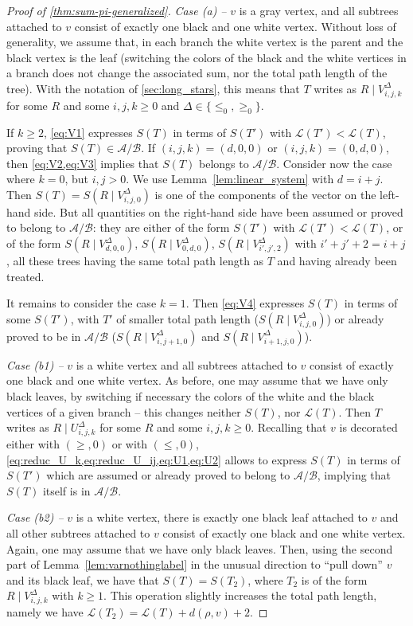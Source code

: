 \documentclass[12pt]{amsart}
\theoremstyle{plain}
\theoremstyle{remark}
\def\cL{\mathcal{L}}
\def\cA{\mathcal{A}}
\def\cB{\mathcal{B}}
\begin{document}
\begin{proof}[Proof of \cref{thm:sum-pi-generalized}]
{\em Case (a) --} $v$ is a gray vertex, 
and all subtrees attached to $v$ consist of exactly one black and one white vertex.
Without loss of generality, we assume that, in each branch the white vertex is the parent and
the black vertex is the leaf (switching the colors of the black and the white vertices in a branch does not change the associated sum, nor the total path length of the tree).
With the notation of \cref{sec:long_stars}, this means that $T$ writes as $R \mid V^{\Delta}_{i,j,k}$
for some $R$ and some $i,j,k \ge 0$ and $\Delta \in \{\le_0,\ge_0\}$.

If $k \ge 2$, \cref{eq:V1} expresses $S(T)$ in terms of $S(T')$ with $\cL(T') <  \cL(T)$,
proving that $S(T) \in \cA/\cB$. 
If $(i,j,k) = (d,0,0)$ or $(i,j,k) = (0,d,0)$, then \cref{eq:V2,eq:V3}
implies that $S(T)$ belongs to $\cA/\cB$.
Consider now the case where $k=0$, but $i,j>0$.
We use Lemma~\ref{lem:linear_system} with $d=i+j$.
 Then $S(T)=S(R \mid V^{\Delta}_{i,j,0})$ is one of the components
 of the vector on the left-hand side. But all quantities on the right-hand side
 have been assumed or proved to belong to $\cA/\cB$:
 they are either of the form $S(T')$ with $\cL(T') <  \cL(T)$, or 
 of the form $S(R \mid V^{\Delta}_{d,0,0})$, $S(R \mid V^{\Delta}_{0,d,0})$, $S(R \mid V^{\Delta}_{i',j',2})$ with $i'+j'+2=i+j$, all these trees having the same total path length as $T$
 and having already been treated.
 
 It remains to consider the case $k=1$. Then \eqref{eq:V4}
 expresses $S(T)$ in terms of some $S(T')$, with $T'$ of smaller total path length ($S(R \mid V^{\Delta}_{i,j,0})$) or already proved to be in  $\cA/\cB$
 ($S(R \mid V^{\Delta}_{i,j+1,0})$ and $S(R \mid V^{\Delta}_{i+1,j,0})$).
 \smallskip
 
 {\em Case (b1) --}
$v$ is a white vertex and all subtrees attached to $v$ 
consist of exactly one black and one white vertex.
As before, one may assume that we have only black leaves, by switching if necessary
the colors of the white and the black vertices of a given branch -- this changes neither $S(T)$, nor $\cL(T)$.
Then $T$ writes as $R \mid U^{\Delta}_{i,j,k}$
for some $R$ and some $i,j,k \ge 0$.
 Recalling that $v$ is decorated either with $(\ge,0)$ or with $(\le,0)$, \cref{eq:reduc_U_k,eq:reduc_U_ij,eq:U1,eq:U2} 
allows to express $S(T)$ in terms of $S(T')$ which are assumed or already proved to belong to  $\cA/\cB$, implying that $S(T)$ itself is in $\cA/\cB$.
\smallskip

 {\em Case (b2) --} $v$ is a white vertex, there is exactly one black leaf attached to $v$ and all other subtrees attached to $v$ 
consist of exactly one black and one white vertex.
 Again, one may assume that we have only black leaves.
 Then, using the second part of Lemma~\ref{lem:varnothinglabel} in the unusual direction
  to \enquote{pull down} $v$ and its black leaf, 
 we have that $S(T)=S(T_2)$, where $T_2$ is of the form $R \mid V^{\Delta}_{i,j,k}$ with $k \ge 1$.
 This operation slightly increases the total path length, namely we have
 $\cL(T_2)=\cL(T)+d(\rho,v)+2$.
 

\end{proof}
\end{document}
